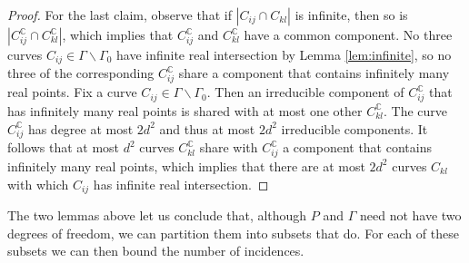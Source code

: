 \documentclass[12pt]{article}
\newcommand{\CC}{\mathbb C}
\begin{document}
\begin{proof}
 For the last claim, observe that if $|C_{ij}\cap C_{kl}|$ is infinite, 
 then so is $|C_{ij}^\CC\cap C_{kl}^\CC|$,
 which implies that $C_{ij}^\CC$ and $C_{kl}^\CC$ have a common component.
 No three curves $C_{ij}\in\Gamma\backslash \Gamma_0$ 
 have infinite real intersection by Lemma \ref{lem:infinite},
 so no three of the corresponding $C_{ij}^\CC$ share a component that contains infinitely many real points.
 Fix a curve $C_{ij}\in\Gamma\backslash \Gamma_0$.
 Then an irreducible component of $C_{ij}^\CC$ that has infinitely many real points 
 is shared with at most one other $C_{kl}^\CC$.
The curve $C_{ij}^\CC$ has degree at most $2d^2$ and thus at most $2d^2$ irreducible components.
 It follows that at most $d^2$ curves $C_{kl}^\CC$ share with $C_{ij}^\CC$
 a component that contains infinitely many real points,
 which implies that there are at most $2d^2$ curves $C_{kl}$ with which
 $C_{ij}$ has infinite real intersection.
\end{proof}

The two lemmas above let us conclude that, 
although $P$ and $\Gamma$ need not have two degrees of freedom, 
we can partition them into subsets that do.
For each of these subsets we can then bound the number of incidences.
  
  
\end{document}
